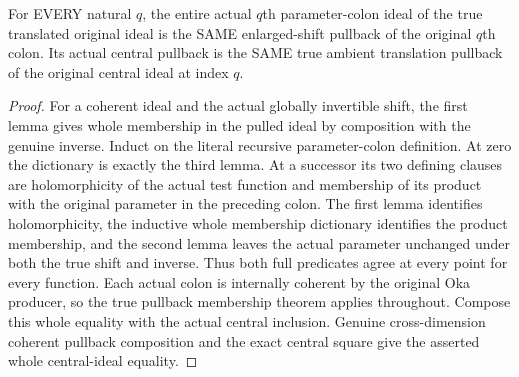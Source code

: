 \begin{lemma}
\label{hir:relative-normal-affine-dnc-colon-central}
\leanok
For EVERY natural $q$, the entire actual $q$th parameter-colon ideal of the true translated original ideal is the SAME enlarged-shift pullback of the original $q$th colon. Its actual central pullback is the SAME true ambient translation pullback of the original central ideal at index $q$.
\end{lemma}
\begin{proof}
For a coherent ideal and the actual globally invertible shift, the first lemma gives whole membership in the pulled ideal by composition with the genuine inverse. Induct on the literal recursive parameter-colon definition. At zero the dictionary is exactly the third lemma. At a successor its two defining clauses are holomorphicity of the actual test function and membership of its product with the original parameter in the preceding colon. The first lemma identifies holomorphicity, the inductive whole membership dictionary identifies the product membership, and the second lemma leaves the actual parameter unchanged under both the true shift and inverse. Thus both full predicates agree at every point for every function. Each actual colon is internally coherent by the original Oka producer, so the true pullback membership theorem applies throughout. Compose this whole equality with the actual central inclusion. Genuine cross-dimension coherent pullback composition and the exact central square give the asserted whole central-ideal equality.
\end{proof}

